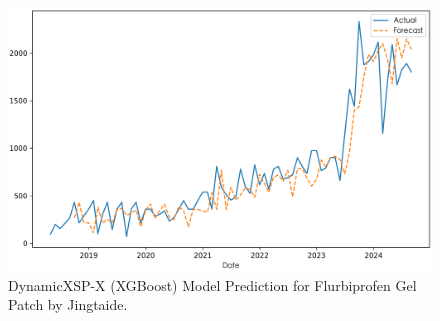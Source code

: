 \documentclass[journal]{IEEEtran}
\begin{document}
\begin{itemize}
\begin{figure}[H]
\centering
\includegraphics[width=\linewidth]{../Result_Paper/XGBoost_Prediction_麦考酚钠肠溶片_瑞士诺华.png}
\caption{DynamicXSP-X (XGBoost) Model Prediction for Flurbiprofen Gel Patch by Jingtaide.}
\label{fig:flurbiprofen}
\end{figure}
\end{itemize}
\end{document}
